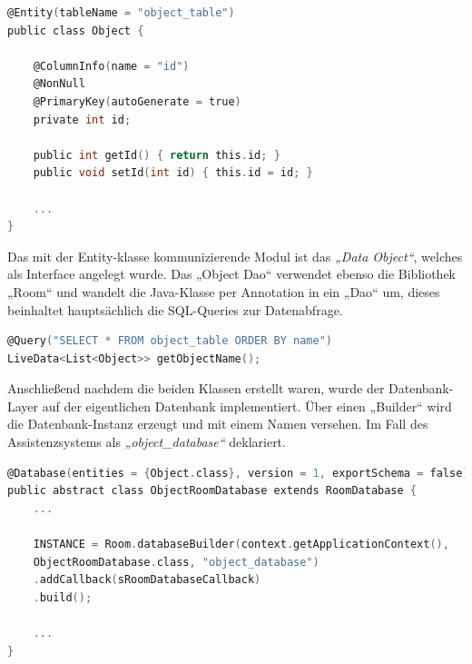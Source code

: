 \begin{lstlisting}[language=C,
    frame=single,           % Ein Rahmen um den Code
    framexleftmargin=-1pt,  % Rahmen link von den Zahlen
    style=algoBericht,
    label={code:entity},
    captionpos=b,           % Caption unter den Code setzen
caption={Entity Code zur Initialisierung der Objekte}]
@Entity(tableName = "object_table")
public class Object {

    @ColumnInfo(name = "id")
    @NonNull
    @PrimaryKey(autoGenerate = true)
    private int id;

    public int getId() { return this.id; }
    public void setId(int id) { this.id = id; }

    ... 
}
\end{lstlisting}
\pagebreak
Das mit der Entity-klasse kommunizierende Modul ist das \textit{„Data Object“}, welches als Interface angelegt wurde. Das „Object Dao“ verwendet ebenso die Bibliothek 
„Room“ und wandelt die Java-Klasse per Annotation in ein „Dao“ um, dieses beinhaltet hauptsächlich die SQL-Queries zur Datenabfrage. 
\begin{lstlisting}[language=C,
    frame=single,           % Ein Rahmen um den Code
    framexleftmargin=-1pt,  % Rahmen link von den Zahlen
    style=algoBericht,
    label={code:query},
    captionpos=b,           % Caption unter den Code setzen
caption={SQL-Query zur Abfrage der Objekt-Namen}]
@Query("SELECT * FROM object_table ORDER BY name")
LiveData<List<Object>> getObjectName();
\end{lstlisting}
Anschließend nachdem die beiden Klassen erstellt waren, wurde der Datenbank-Layer auf der eigentlichen Datenbank implementiert. Über einen „Builder“ wird die 
Datenbank-Instanz erzeugt und mit einem Namen versehen. Im Fall des Assistenzsystems als \textit{„object\_database“} deklariert. 
\begin{lstlisting}[language=C,
    frame=single,           % Ein Rahmen um den Code
    framexleftmargin=-1pt,  % Rahmen link von den Zahlen
    style=algoBericht,
    label={code:dblayer},
    captionpos=b,           % Caption unter den Code setzen
caption={Erzeugung des Datenbank-Layers „Room“}]
@Database(entities = {Object.class}, version = 1, exportSchema = false)
public abstract class ObjectRoomDatabase extends RoomDatabase {
    ...

    INSTANCE = Room.databaseBuilder(context.getApplicationContext(),
    ObjectRoomDatabase.class, "object_database")
    .addCallback(sRoomDatabaseCallback)
    .build();

    ...
}
\end{lstlisting}
